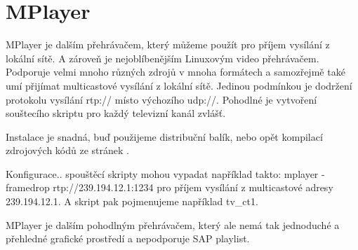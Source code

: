 \vspace{10pt}

\section {MPlayer}

MPlayer je dalším přehrávačem, který můžeme použít pro příjem vysílání z lokální sítě. A zároveň je nejoblíbenějším Linuxovým video přehrávačem. Podporuje velmi mnoho různých zdrojů v mnoha formátech a samozřejmě také umí přijímat multicastové vysílání z lokální sítě. Jedinou podmínkou je dodržení protokolu vysílání rtp:// místo výchozího udp://. Pohodlné je vytvoření souštecího skriptu pro každý televizní kanál zvlášť.

\vspace{10pt}

Instalace je snadná, buď použijeme distribuční balík, nebo opět kompilací zdrojových kódů ze stránek \cite{mplayerURL}. 

\vspace{10pt}

Konfigurace.. spouštěcí skripty mohou vypadat například takto:
mplayer -framedrop rtp://239.194.12.1:1234 
pro příjem vysílání z multicastové adresy 239.194.12.1. A skript pak pojmenujeme například tv\_ct1.

\vspace{10pt}

MPlayer je dalším pohodlným přehrávačem, který ale nemá tak jednoduché a přehledné grafické prostředí a nepodporuje SAP playlist.

\vspace{10pt}

